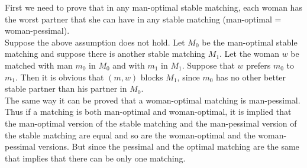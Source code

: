 First we need to prove that in any man-optimal stable matching, each woman has the worst partner that she can have in any stable matching (man-optimal = woman-pessimal).\\
Suppose the above assumption does not hold. Let $M_0$ be the man-optimal stable matching and suppose there is another stable matching $M_1$. Let the woman $w$ be matched with man $m_0$ in $M_0$ and with $m_1$ in $M_1$. Suppose that $w$ prefers $m_0$ to $m_1$. Then it is obvious that $(m,w)$ blocks $M_1$, since $m_0$ has no other better stable partner than his partner in $M_0$.\\
The same way it can be proved that a woman-optimal matching is man-pessimal.\\
Thus if a matching is both man-optimal and woman-optimal, it is implied that the man-optimal version of the stable matching and the man-pessimal version of the stable matching are equal and so are the woman-optimal and the woman-pessimal versions. But since the pessimal and the optimal matching are the same that implies that there can be only one matching.